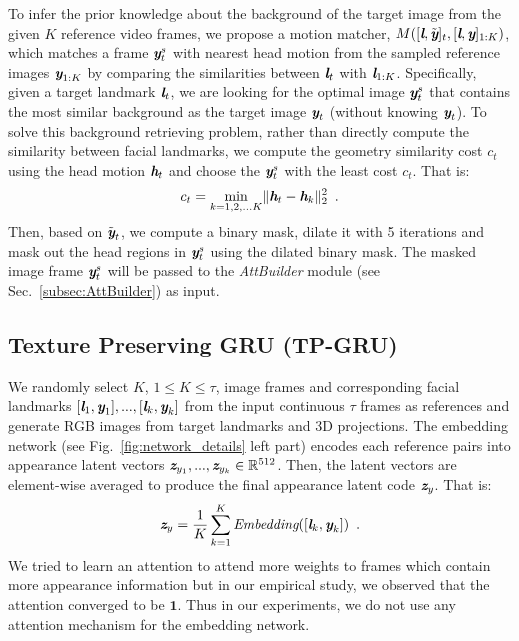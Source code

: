 \documentclass[runningheads]{llncs}
\def\mathbi#1{\textbf{\em #1}}
\begin{document}
\indent   To infer the prior knowledge about the background of the target image from the given $K$ reference video frames, we propose a motion matcher, $M([\mathbi{l}, \tilde{\mathbi{y}}]_{t}, [\mathbi{l}, \mathbi{y}]_{1:K})$, which matches a frame $\mathbi{y}_t^s$ with nearest head motion from the sampled reference images $\mathbi{y}_{1:K}$ by comparing the similarities between $\mathbi{l}_{t}$ with $\mathbi{l}_{1:K}$. Specifically, given a target landmark $\mathbi{l}_t$, we are looking for the optimal image $\mathbi{y}_t^s$ that contains the most similar background as the target image $\mathbi{y}_t$ (without knowing $\mathbi{y}_t$). To solve this background retrieving problem, rather than directly compute the similarity between facial landmarks, we compute the geometry similarity cost $c_{t}$ using the head motion $\mathbi{h}_t$ and choose the $\mathbi{y}_t^s$ with the least cost $c_t$. That is:
\begin{equation}
\begin{aligned}
c_{t}= \min_{k=1,2,...K}  \lVert \mathbi{h}_t - \mathbi{h}_k \rVert^2_2 \enspace.
\end{aligned}
\label{eq:cost}    
\end{equation}
  Then, based on $\tilde{\mathbi{y}}_t$, we compute a binary mask, dilate it with 5 iterations and mask out the head regions in $\mathbi{y}_t^s$ using the dilated binary mask. The masked image frame $\mathbi{y}^s_{t}$ will be passed to the \textit{AttBuilder} module (see Sec.~\ref{subsec:AttBuilder}) as input. 
  
\subsection{Texture Preserving GRU (TP-GRU)}
\label{subsec:details}

\indent We randomly select $K$, $1 \leq K \leq \tau$, image frames and corresponding facial landmarks $[\mathbi{l}_1,\mathbi{y}_1],..., [\mathbi{l}_k,\mathbi{y}_k]$ from the input continuous $\tau$ frames as references and generate RGB images from target landmarks and 3D projections. The embedding network (see Fig.~\ref{fig:network_details} left part) encodes each reference pairs into appearance latent vectors $\mathbi{z}_{y_1},...,\mathbi{z}_{y_k} \in \mathbb{R}^{512}$. Then, the latent vectors are element-wise averaged to produce the final appearance latent code $\mathbi{z}_{y}$. That is:
\begin{equation}
\begin{aligned}
\mathbi{z}_y = \frac1{K} \sum\limits_{k=1}^K \textit{Embedding}([\mathbi{l}_k,\mathbi{y}_k]) \enspace.
\end{aligned}
\label{eq:embedder}
\end{equation}
We tried to learn an attention to attend more weights to frames which contain more appearance information but in our empirical study, we observed that the attention converged to be $\mathbf{1}$. Thus in our experiments, we do not use any attention mechanism for the embedding network.
\end{document}
